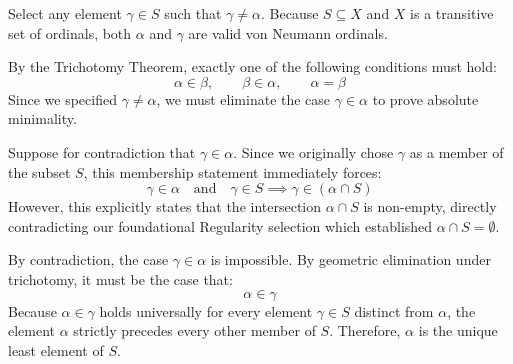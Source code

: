 Select any element $\gamma \in S$ such that $\gamma \neq \alpha$. Because $S \subseteq X$ and $X$ is a transitive set of ordinals, both $\alpha$ and $\gamma$ are valid von Neumann ordinals. 

By the Trichotomy Theorem, exactly one of the following conditions must hold:
\[
\alpha \in \beta, \qquad \beta \in \alpha, \qquad \alpha = \beta
\]
Since we specified $\gamma \neq \alpha$, we must eliminate the case $\gamma \in \alpha$ to prove absolute minimality.

Suppose for contradiction that $\gamma \in \alpha$. Since we originally chose $\gamma$ as a member of the subset $S$, this membership statement immediately forces:
\[
\gamma \in \alpha \quad \text{and} \quad \gamma \in S \implies \gamma \in (\alpha \cap S)
\]
However, this explicitly states that the intersection $\alpha \cap S$ is non-empty, directly contradicting our foundational Regularity selection which established $\alpha \cap S = \emptyset$. 

By contradiction, the case $\gamma \in \alpha$ is impossible. By geometric elimination under trichotomy, it must be the case that:
\[
\alpha \in \gamma
\]
Because $\alpha \in \gamma$ holds universally for every element $\gamma \in S$ distinct from $\alpha$, the element $\alpha$ strictly precedes every other member of $S$. Therefore, $\alpha$ is the unique least element of $S$.